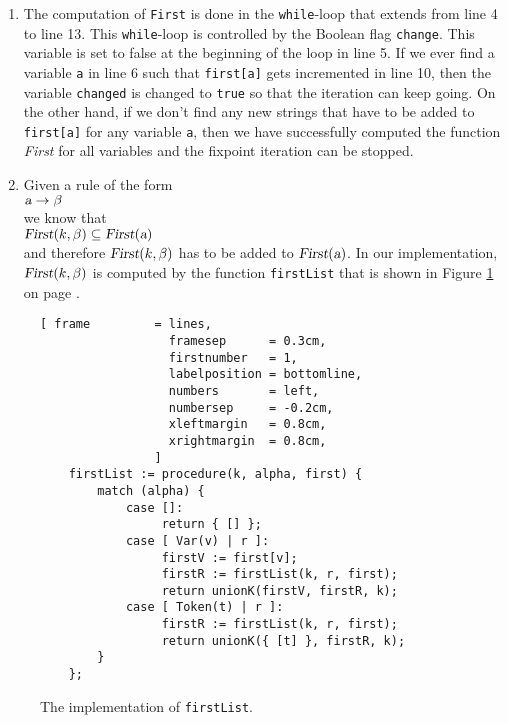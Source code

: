\begin{enumerate}
      Since the function \texttt{first} is computed via a fixpoint iteration, $\mathtt{first}[\textsl{a}]$
      is initialized to the empty set for all syntactical variables $\textsl{a}$.  This is done by the function
      \texttt{initializeMap} in line 2.  The function \texttt{initializeMap} is shown in
      Figure \ref{fig:llk.stlx:auxiliary} in line 1.
\item The computation of \texttt{First} is done in the \texttt{while}-loop that extends from line 4
      to line 13.  This \texttt{while}-loop is controlled by the Boolean flag
      \texttt{change}.  This variable is set to false at the beginning of the loop in line 5.
      If we ever find a variable \texttt{a} in line 6 such that \texttt{first[a]} gets incremented
      in line 10,
      then the variable \texttt{changed} is changed to \texttt{true} so that the iteration can keep going.
      On the other hand, if we don't find any new strings that have to be added to \texttt{first[a]}
      for any variable \texttt{a}, then we have successfully computed the function \textsl{First}
      for all variables and the fixpoint iteration can be stopped.
\item Given a rule of the form
      \\[0.2cm]
      \hspace*{1.3cm}
      $\textsl{a} \rightarrow \beta$
      \\[0.2cm]
      we know that 
      \\[0.2cm]
      \hspace*{1.3cm}
      $\textsl{First}(k, \beta) \subseteq \textsl{First}(\textsl{a})$
      \\[0.2cm]
      and therefore $\textsl{First}(k, \beta)$ has to be added to $\textsl{First}(\textsl{a})$.
      In our implementation,  $\textsl{First}(k, \beta)$ is computed by the function
      \texttt{firstList} that is shown in Figure \ref{fig:llk.stlx:firstList} on page
      \pageref{fig:llk.stlx:firstList}.
\end{enumerate}


\begin{figure}[!ht]
\centering
\begin{Verbatim}[ frame         = lines, 
                  framesep      = 0.3cm, 
                  firstnumber   = 1,
                  labelposition = bottomline,
                  numbers       = left,
                  numbersep     = -0.2cm,
                  xleftmargin   = 0.8cm,
                  xrightmargin  = 0.8cm,
                ]
    firstList := procedure(k, alpha, first) {
        match (alpha) {
            case []: 
                 return { [] };
            case [ Var(v) | r ]:
                 firstV := first[v];
                 firstR := firstList(k, r, first);
                 return unionK(firstV, firstR, k);
            case [ Token(t) | r ]:
                 firstR := firstList(k, r, first);
                 return unionK({ [t] }, firstR, k);
        }
    }; 
\end{Verbatim}
\vspace*{-0.3cm}
\caption{The implementation of \texttt{firstList}.}
\label{fig:llk.stlx:firstList}
\end{figure}

